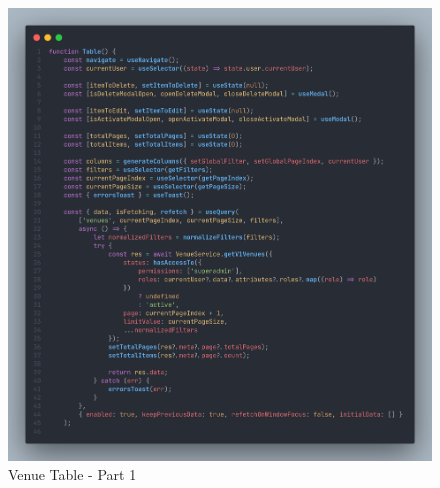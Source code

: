 \begin{justify}
\begin{itemize}
\begin{itemize}
                        \begin{figure}[H]
                            \centerline{\includegraphics[width=150mm,scale=1]{figures/implementation_and_testing/implementation/frontend/table-1.png}}
                            \caption{Venue Table - Part 1}
                        \end{figure}
            

\end{itemize}
\end{itemize}
\end{justify}
